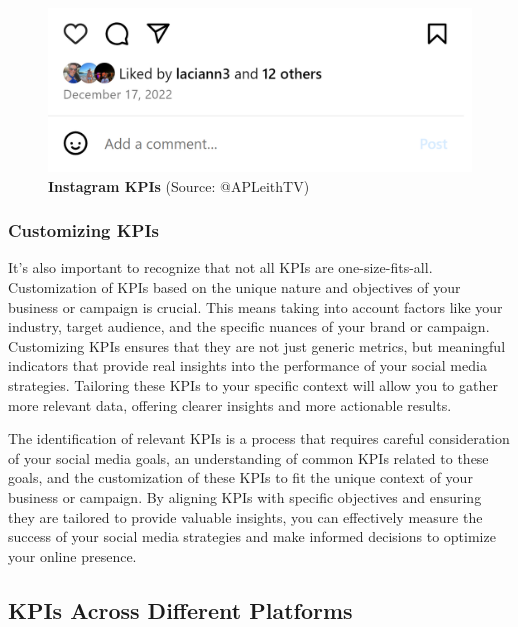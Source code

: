 \documentclass[
]{book}
\begin{document}
\begin{figure}
\centering
\includegraphics[width=1\textwidth,height=\textheight]{images/instagram_kpi-01.PNG}
\caption{\textbf{Instagram KPIs} (Source: @APLeithTV)}
\end{figure}

\hypertarget{customizing-kpis}{%
\subsubsection*{Customizing KPIs}\label{customizing-kpis}}

It's also important to recognize that not all KPIs are one-size-fits-all. Customization of KPIs based on the unique nature and objectives of your business or campaign is crucial. This means taking into account factors like your industry, target audience, and the specific nuances of your brand or campaign. Customizing KPIs ensures that they are not just generic metrics, but meaningful indicators that provide real insights into the performance of your social media strategies. Tailoring these KPIs to your specific context will allow you to gather more relevant data, offering clearer insights and more actionable results.

The identification of relevant KPIs is a process that requires careful consideration of your social media goals, an understanding of common KPIs related to these goals, and the customization of these KPIs to fit the unique context of your business or campaign. By aligning KPIs with specific objectives and ensuring they are tailored to provide valuable insights, you can effectively measure the success of your social media strategies and make informed decisions to optimize your online presence.

\hypertarget{kpis-across-different-platforms}{%
\subsection*{KPIs Across Different Platforms}\label{kpis-across-different-platforms}}
\end{document}
